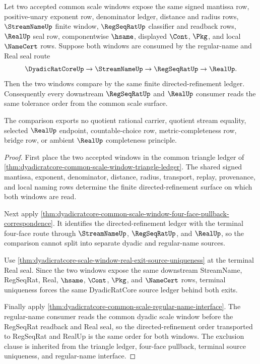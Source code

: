 \begin{theorem}
\label{thm:dyadicratcore-common-scale-comparison}
Let two accepted common scale windows expose the same signed mantissa row, positive-unary exponent row, denominator ledger, distance and radius rows, $\StreamNameUp$ finite window, $\RegSeqRatUp$ classifier and readback rows, $\RealUp$ seal row, componentwise $\hsame$, displayed $\Cont$, $\Pkg$, and local $\NameCert$ rows. Suppose both windows are consumed by the regular-name and Real seal route
$$
\DyadicRatCoreUp \to \StreamNameUp \to \RegSeqRatUp \to \RealUp .
$$
Then the two windows compare by the same finite directed-refinement ledger. Consequently every downstream $\RegSeqRatUp$ and $\RealUp$ consumer reads the same tolerance order from the common scale surface.

The comparison exports no quotient rational carrier, quotient stream equality, selected $\RealUp$ endpoint, countable-choice row, metric-completeness row, bridge row, or ambient $\RealUp$ completeness principle.
\end{theorem}
\begin{proof}
First place the two accepted windows in the common triangle ledger of \autoref{thm:dyadicratcore-common-scale-window-triangle-ledger}. The shared signed mantissa, exponent, denominator, distance, radius, transport, replay, provenance, and local naming rows determine the finite directed-refinement surface on which both windows are read.

Next apply \autoref{thm:dyadicratcore-common-scale-window-four-face-pullback-correspondence}. It identifies the directed-refinement ledger with the terminal four-face route through $\StreamNameUp$, $\RegSeqRatUp$, and $\RealUp$, so the comparison cannot split into separate dyadic and regular-name sources.

Use \autoref{thm:dyadicratcore-scale-window-real-exit-source-uniqueness} at the terminal Real seal. Since the two windows expose the same downstream StreamName, RegSeqRat, Real, $\hsame$, $\Cont$, $\Pkg$, and $\NameCert$ rows, terminal uniqueness forces the same DyadicRatCore source ledger behind both exits.

Finally apply \autoref{thm:dyadicratcore-common-scale-regular-name-interface}. The regular-name consumer reads the common dyadic scale window before the RegSeqRat readback and Real seal, so the directed-refinement order transported to RegSeqRat and RealUp is the same order for both windows. The exclusion clause is inherited from the triangle ledger, four-face pullback, terminal source uniqueness, and regular-name interface.
\end{proof}

